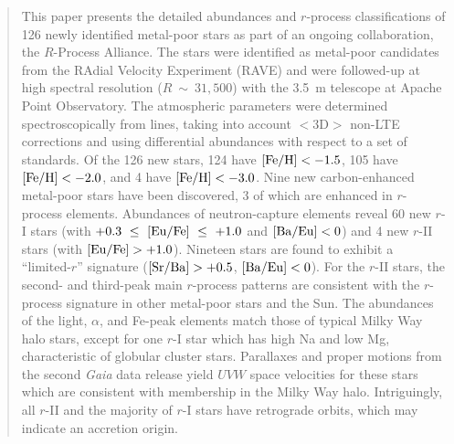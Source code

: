 \documentclass[preprint]{aastex61}
\begin{document}
\author{Matthias Steinmetz}

\author{Fred Watson}




\begin{abstract}
This paper presents the detailed abundances and $r$-process
classifications of 126 newly identified metal-poor stars as part of an
ongoing collaboration, the $R$-Process Alliance.  The stars were
identified as metal-poor candidates from the RAdial Velocity
Experiment (RAVE) and were followed-up at high spectral resolution
($R~\sim~31,500$) with the 3.5~m telescope at
Apache Point Observatory. The atmospheric parameters were determined
spectroscopically from  lines, taking into account $<$3D$>$
non-LTE corrections and using differential abundances with respect
to a set of standards. Of the 126 new stars, 124 have
$[\rm{Fe/H}]<-1.5$, 105 have $[\rm{Fe/H}]<-2.0$, and 4 have
$[\rm{Fe/H}]<-3.0$. Nine new carbon-enhanced metal-poor stars have
been discovered, 3 of which are enhanced in $r$-process
elements. Abundances of neutron-capture elements reveal 60 new $r$-I
stars (with $+0.3~\le~[\rm{Eu/Fe}]~\le~+1.0$ and $[\rm{Ba/Eu}]<0$) and 4
new $r$-II stars (with $[\rm{Eu/Fe}]>+1.0$). Nineteen stars are found
to exhibit a ``limited-$r$'' signature ($[\rm{Sr/Ba}]>+0.5$,
$[\rm{Ba/Eu}]<0$). For the $r$-II stars, the second- and third-peak
main $r$-process patterns are consistent with the $r$-process
signature in other metal-poor stars and the Sun. The abundances of
the light, $\alpha$, and Fe-peak elements match those of typical Milky
Way halo stars, except for one $r$-I star which has high
Na and low Mg, characteristic of globular cluster stars. Parallaxes
and proper motions from the second {\it Gaia} data release yield $UVW$
space velocities for these stars which are consistent with membership
in the Milky Way halo. Intriguingly, all $r$-II and the majority of
$r$-I stars have retrograde orbits, which may indicate an accretion
origin.
\end{abstract}

\end{document}
